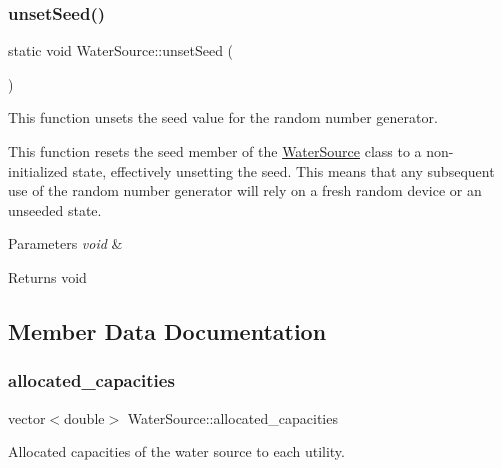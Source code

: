 \subsubsection{\texorpdfstring{unset\+Seed()}{unsetSeed()}}
{\footnotesize\ttfamily static void Water\+Source\+::unset\+Seed (\begin{DoxyParamCaption}{ }\end{DoxyParamCaption})\hspace{0.3cm}{\ttfamily [static]}}



This function unsets the seed value for the random number generator. 

This function resets the {\ttfamily seed} member of the {\ttfamily \mbox{\hyperlink{classWaterSource}{Water\+Source}}} class to a non-\/initialized state, effectively unsetting the seed. This means that any subsequent use of the random number generator will rely on a fresh random device or an unseeded state.


\begin{DoxyParams}{Parameters}
{\em void} & \\
\hline
\end{DoxyParams}
\begin{DoxyReturn}{Returns}
void 
\end{DoxyReturn}


\subsection{Member Data Documentation}
\mbox{\label{classWaterSource_ab94063d51314cfb896010408ae32fa9c}} 
\subsubsection{\texorpdfstring{allocated\+\_\+capacities}{allocated\_capacities}}
{\footnotesize\ttfamily vector$<$double$>$ Water\+Source\+::allocated\+\_\+capacities\hspace{0.3cm}{\ttfamily [protected]}}



Allocated capacities of the water source to each utility. 

\mbox{\label{classWaterSource_a2f6655a80c4847fe039987255d9d998c}} 
